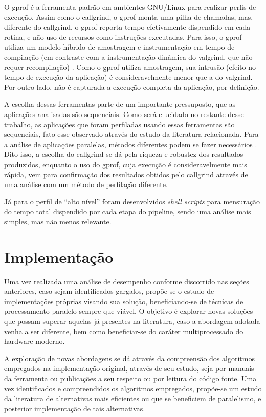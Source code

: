 \documentclass[cic,tc]{iiufrgs}
\begin{document}
{O gprof é a ferramenta padrão em ambientes GNU/Linux para realizar perfis de
execução. Assim como o callgrind, o gprof monta uma pilha de chamadas, mas,
diferente do callgrind, o gprof reporta tempo efetivamente dispendido em cada
rotina, e não uso de recursos como instruções executadas. Para isso, o gprof
utiliza um modelo híbrido de amostragem e instrumentação em tempo de compilação
(em contraste com a instrumentação dinâmica do valgrind, que não requer
recompilação) \cite{graham1982gprof}. Como o gprof utiliza amostragem, sua
intrusão (efeito no tempo de execução da aplicação) é consideravelmente menor
que a do valgrind. Por outro lado, não é capturada a execução completa da
aplicação, por definição.

A escolha dessas ferramentas parte de um importante pressuposto, que as
aplicações analisadas são sequenciais. Como será elucidado no restante desse
trabalho, as aplicações que foram perfiladas usando essas ferramentas são
sequenciais, fato esse observado através do estudo da literatura relacionada.
Para a análise de aplicações paralelas, métodos diferentes podem se fazer
necessários \cite{weidendorfer2008sequential}. Dito isso, a escolha do callgrind
se dá pela riqueza e robustez dos resultados produzidos, enquanto o uso do
gprof, cuja execução é consideravelmente mais rápida, vem para confirmação dos
resultados obtidos pelo callgrind através de uma análise com um método de
perfilação diferente.

Já para o perfil de ``alto nível'' foram desenvolvidos \textit{shell scripts}
para mensuração do tempo total dispendido por cada etapa do pipeline, sendo uma
análise mais simples, mas não menos relevante.

\section{Implementação}

Uma vez realizada uma análise de desempenho conforme discorrido nas seções
anteriores, caso sejam identificados gargalos, propõe-se o estudo de
implementações próprias visando sua solução, beneficiando-se de técnicas de
processamento paralelo sempre que viável. O objetivo é explorar novas soluções
que possam superar aquelas já presentes na literatura, caso a abordagem adotada
venha a ser diferente, bem como beneficiar-se do caráter multiprocessado do
hardware moderno.

A exploração de novas abordagens se dá através da compreensão dos algoritmos
empregados na implementação original, através de seu estudo, seja por manuais
da ferramenta ou publicações a seu respeito ou por leitura do código fonte. Uma
vez identificados e compreendidos os algoritmos empregados, propõe-se um estudo
da literatura de alternativas mais eficientes ou que se beneficiem de
paralelismo, e posterior implementação de tais alternativas.

}
\end{document}
